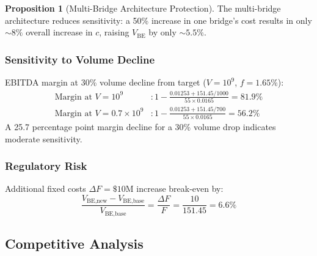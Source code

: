 \documentclass[12pt,a4paper]{article}
\theoremstyle{definition}
\newtheorem{proposition}[theorem]{Proposition}
\theoremstyle{remark}
\newcommand{\USD}[1]{\$#1}
\begin{document}
\begin{proposition}[Multi-Bridge Architecture Protection]
The multi-bridge architecture reduces sensitivity: a 50\% increase in one bridge's cost results in only ${\sim}8\%$ overall increase in $c$, raising $V_{\text{BE}}$ by only ${\sim}5.5\%$.
\end{proposition}

\subsubsection{Sensitivity to Volume Decline}

EBITDA margin at 30\% volume decline from target ($V = 10^9$, $f = 1.65\%$):
\begin{align}
\text{Margin at } V = 10^9 &: 1 - \frac{0.01253 + 151.45/1000}{55 \times 0.0165} = 81.9\% \\
\text{Margin at } V = 0.7 \times 10^9 &: 1 - \frac{0.01253 + 151.45/700}{55 \times 0.0165} = 56.2\%
\end{align}
A 25.7 percentage point margin decline for a 30\% volume drop indicates moderate sensitivity.

\subsubsection{Regulatory Risk}

Additional fixed costs $\Delta F = \USD{10\text{M}}$ increase break-even by:
\begin{equation}
\frac{V_{\text{BE,new}} - V_{\text{BE,base}}}{V_{\text{BE,base}}} = \frac{\Delta F}{F} = \frac{10}{151.45} = 6.6\%
\end{equation}

\subsection{Competitive Analysis}
\end{document}
